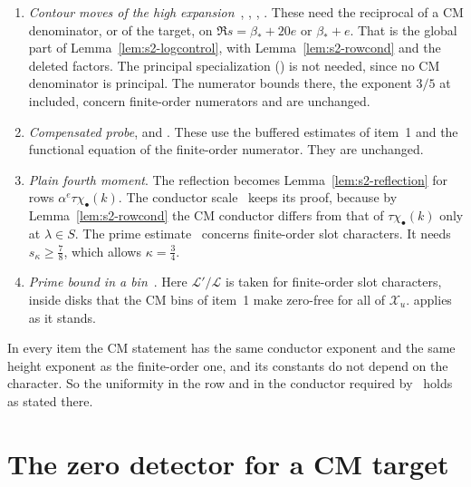 \documentclass[11pt]{article}
\numberwithin{equation}{section}
\begin{document}
\begin{enumerate}
 $Q_{\psi^*}^{3/5}(3+|\gamma+v|)^2$ as~\cite[eq.~(4.14)]{OAI78}.
\item \emph{Contour moves of the high expansion}~\cite[Lemmas 10.3,
 10.5 and 10.6]{OAI78}, \cite[proof of Lemma~10.3]{OAI78}, \cite[proof of Lemma~10.5]{OAI78}, \cite[proof of Lemma~10.6]{OAI78}. These
 need the reciprocal of a CM denominator, or of the target, on $\Re s=\beta_*+20e$ or $\beta_*+e$. That is the
 global part of Lemma~\ref{lem:s2-logcontrol}, with Lemma~\ref{lem:s2-rowcond} and the deleted factors. The
 principal specialization (\cite[proof of Lemma~10.6]{OAI78}) is not needed, since no CM denominator is principal. The numerator
 bounds there, the exponent $3/5$ at \cite[proof of Lemma~10.6]{OAI78} included, concern finite-order numerators and are unchanged.
\item \emph{Compensated probe}, \cite[Section~16.2]{OAI78} and \cite[proof of Proposition~16.1]{OAI78}. These use the buffered estimates of item~1 and the
 functional equation of the finite-order numerator. They are unchanged.
\item \emph{Plain fourth moment}. The reflection \cite[Section~18.1]{OAI78} becomes Lemma~\ref{lem:s2-reflection} for rows
 $\alpha^e\tau\chi_\bullet(k)$. The conductor scale~\cite[eq.~(18.7)]{OAI78} keeps its proof, because by
 Lemma~\ref{lem:s2-rowcond} the CM conductor differs from that of $\tau\chi_\bullet(k)$ only at $\lambda\in S$.
 The prime estimate~\cite[eq.~(18.11)]{OAI78} concerns finite-order slot characters. It needs
 $s_\kappa\ge\frac78$, which allows $\kappa=\frac34$.
\item \emph{Prime bound in a bin}~\cite[Lemma~19.1 and its proof]{OAI78}. Here
 $\mathcal L'/\mathcal L$ is taken for finite-order slot characters, inside disks that the CM bins of item~1 make
 zero-free for all of $\mathcal X_u$. \cite[Lemma~4.9]{OAI78} applies as it stands.
\end{enumerate}
In every item the CM statement has the same conductor exponent and the same height exponent as the
finite-order one, and its constants do not depend on the character. So the uniformity in the row and in the
conductor required by~\cite{OAI78} holds as stated there.

\section{The zero detector for a CM target}\label{app:s3-detector}
\end{document}
